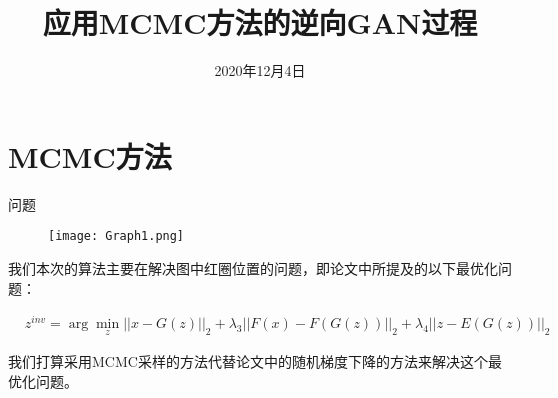 \documentclass[9pt]{beamer}
\title{应用MCMC方法的逆向GAN过程}
\institute[SJTU] %
{
  Department of Mathematics\\
  Shanghai Jiao Tong University
}
\date{2020年12月4日}
\begin{document}
\begin{frame}
  \titlepage
\end{frame}



\section{MCMC方法}


\begin{frame}{问题}

\begin{center}
	\begin{figure}
		\begin{centering}
			\texttt{[image: Graph1.png]}
		\par\end{centering}
	\end{figure}
\par\end{center}

我们本次的算法主要在解决图中红圈位置的问题，即论文中所提及的以下最优化问题：

\begin{equation}
\begin{aligned}
& z^{inv} = \mathop{\arg}\min\limits_{z} || x - G(z)||_{2} + \lambda_{3} ||F(x) - F(G(z))||_{2} + \lambda_{4} ||z-E(G(z))||_{2}
\end{aligned}
\end{equation}

我们打算采用MCMC采样的方法代替论文中的随机梯度下降的方法来解决这个最优化问题。

\end{frame}
\end{document}
